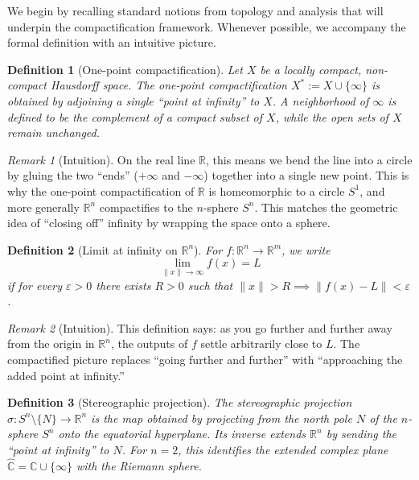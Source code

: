 \documentclass[12pt]{article}
\newtheorem{definition}{Definition}
\theoremstyle{remark}
\newtheorem*{remark}{Remark}
\begin{document}

We begin by recalling standard notions from topology and analysis that will 
underpin the compactification framework. Whenever possible, we accompany the 
formal definition with an intuitive picture.

\begin{definition}[One-point compactification]
Let $X$ be a locally compact, non-compact Hausdorff space. The one-point 
compactification $X^* := X \cup \{\infty\}$ is obtained by adjoining a single 
“point at infinity” to $X$. A neighborhood of $\infty$ is defined to be the 
complement of a compact subset of $X$, while the open sets of $X$ remain 
unchanged.
\end{definition}

\begin{remark}[Intuition]
On the real line $\mathbb{R}$, this means we bend the line into a circle by 
gluing the two “ends” ($+\infty$ and $-\infty$) together into a single new point. 
This is why the one-point compactification of $\mathbb{R}$ is homeomorphic to a 
circle $S^1$, and more generally $\mathbb{R}^n$ compactifies to the $n$-sphere $S^n$. 
This matches the geometric idea of “closing off” infinity by wrapping the space 
onto a sphere.
\end{remark}

\begin{definition}[Limit at infinity on $\mathbb{R}^n$]
For $f:\mathbb{R}^n \to \mathbb{R}^m$, we write 
\[
\lim_{\|x\|\to \infty} f(x) = L
\]
if for every $\varepsilon > 0$ there exists $R > 0$ such that 
$\|x\| > R \implies \|f(x)-L\| < \varepsilon$. 
\end{definition}

\begin{remark}[Intuition]
This definition says: as you go further and further away from the origin in 
$\mathbb{R}^n$, the outputs of $f$ settle arbitrarily close to $L$. The compactified 
picture replaces “going further and further” with “approaching the added point at infinity.”
\end{remark}

\begin{definition}[Stereographic projection]
The stereographic projection $\sigma : S^n \setminus \{N\} \to \mathbb{R}^n$ 
is the map obtained by projecting from the north pole $N$ of the $n$-sphere $S^n$ 
onto the equatorial hyperplane. Its inverse extends $\mathbb{R}^n$ by sending the 
“point at infinity” to $N$. For $n=2$, this identifies the extended complex plane 
$\hat{\mathbb{C}} = \mathbb{C}\cup\{\infty\}$ with the Riemann sphere.
\end{definition}
\end{document}
